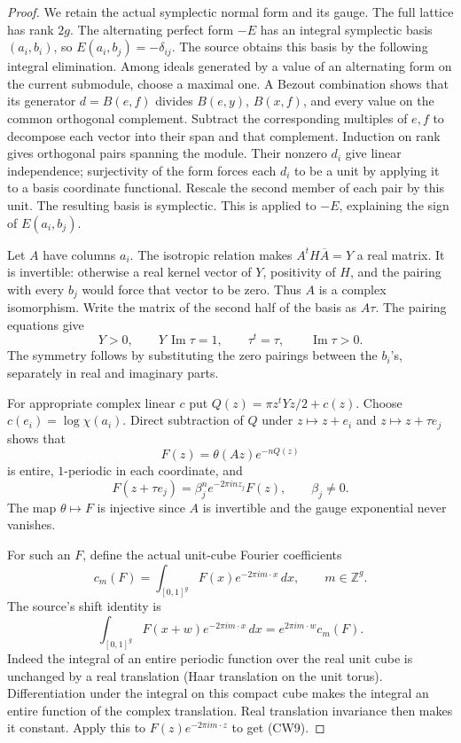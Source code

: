 \begin{proof}
We retain the actual symplectic normal form and its gauge.
The full lattice has rank \(2g\).  The alternating perfect form
\(-E\) has an integral symplectic basis \((a_i,b_i)\), so
\(E(a_i,b_j)=-\delta_{ij}\).
The source obtains this basis by the following integral elimination.
Among ideals generated by a value of an alternating form on the
current submodule, choose a maximal one.  A Bezout combination
shows that its generator \(d=B(e,f)\) divides \(B(e,y)\),
\(B(x,f)\), and every value on the common orthogonal complement.
Subtract the corresponding multiples of \(e,f\) to decompose each
vector into their span and that complement.  Induction on rank
gives orthogonal pairs spanning the module.  Their nonzero \(d_i\)
give linear independence; surjectivity of the form forces each
\(d_i\) to be a unit by applying it to a basis coordinate functional.
Rescale the second member of each pair by this unit.  The resulting
basis is symplectic.  This is applied to \(-E\), explaining the
sign of \(E(a_i,b_j)\).

Let \(A\) have columns \(a_i\).  The isotropic relation makes
\(A^tH\overline A=Y\) a real matrix.  It is invertible:
otherwise a real kernel vector of \(Y\), positivity of \(H\),
and the pairing with every \(b_j\) would force that vector to be
zero.  Thus \(A\) is a complex isomorphism.  Write the matrix of
the second half of the basis as \(A\tau\).
The pairing equations give
\[
             Y>0,\qquad Y\,\operatorname{Im}\tau=1,\qquad
             \tau^t=\tau,\qquad \operatorname{Im}\tau>0 .
\]
The symmetry follows by substituting the zero pairings between
the \(b_i\)'s, separately in real and imaginary parts.

For appropriate complex linear \(c\) put
\(Q(z)=\pi z^tYz/2+c(z)\).
Choose \(c(e_i)=\log\chi(a_i)\).  Direct subtraction of \(Q\)
under \(z\mapsto z+e_i\) and \(z\mapsto z+\tau e_j\) shows that
\[
                   F(z)=\theta(Az)e^{-nQ(z)}
\]
is entire, \(1\)-periodic in each coordinate, and
\[
          F(z+\tau e_j)=\beta_j^n
                    e^{-2\pi i n z_j}F(z),\qquad \beta_j\ne0. \tag{CW8}
\]
The map \(\theta\mapsto F\) is injective since \(A\) is invertible
and the gauge exponential never vanishes.

For such an \(F\), define the actual unit-cube Fourier coefficients
\[
             c_m(F)=\int_{[0,1]^g}F(x)e^{-2\pi i m\cdot x}\,dx,
                      \qquad m\in\mathbb Z^g .
\]
The source's shift identity is
\[
 \int_{[0,1]^g}F(x+w)e^{-2\pi i m\cdot x}\,dx
                      =e^{2\pi i m\cdot w}c_m(F).           \tag{CW9}
\]
Indeed the integral of an entire periodic function over the real
unit cube is unchanged by a real translation (Haar translation
on the unit torus).  Differentiation under the integral on this
compact cube makes the integral an entire function of the complex
translation.  Real translation invariance then makes it constant.
Apply this to \(F(z)e^{-2\pi i m\cdot z}\) to get (CW9).


\end{proof}
